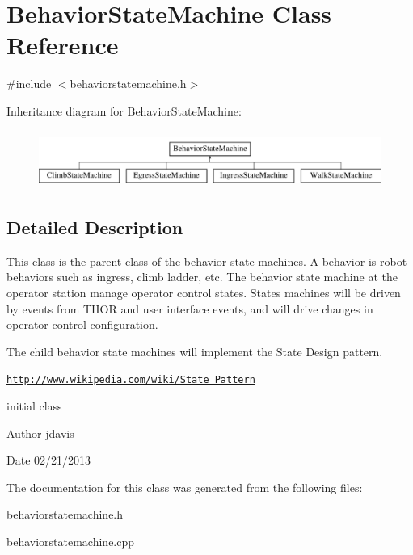 \hypertarget{classBehaviorStateMachine}{\section{Behavior\-State\-Machine Class Reference}
\label{classBehaviorStateMachine}
}


{\ttfamily \#include $<$behaviorstatemachine.\-h$>$}

Inheritance diagram for Behavior\-State\-Machine\-:\begin{figure}[H]
\begin{center}
\leavevmode
\includegraphics[height=1.891892cm]{classBehaviorStateMachine}
\end{center}
\end{figure}


\subsection{Detailed Description}
This class is the parent class of the behavior state machines. A behavior is robot behaviors such as ingress, climb ladder, etc. The behavior state machine at the operator station manage operator control states. States machines will be driven by events from T\-H\-O\-R and user interface events, and will drive changes in operator control configuration.

The child behavior state machines will implement the State Design pattern.

\href{http://www.wikipedia.com/wiki/State_Pattern}{\tt http\-://www.\-wikipedia.\-com/wiki/\-State\-\_\-\-Pattern}

initial class \begin{DoxyAuthor}{Author}
jdavis 
\end{DoxyAuthor}
\begin{DoxyDate}{Date}
02/21/2013 
\end{DoxyDate}


The documentation for this class was generated from the following files\-:\begin{DoxyCompactItemize}
\item 
behaviorstatemachine.\-h\item 
behaviorstatemachine.\-cpp\end{DoxyCompactItemize}
